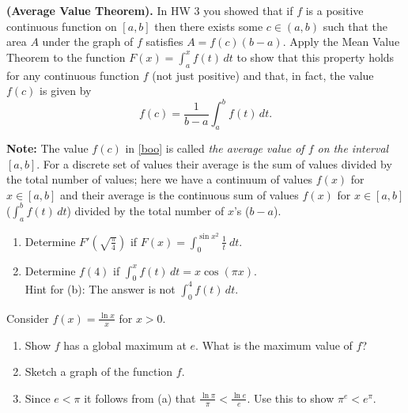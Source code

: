 \documentclass[12pt,letterpaper]{hmcpset}
\begin{document}

\begin{problem}[1]
  \textbf{(Average Value Theorem).} In HW 3 you showed that if $f$ is a positive continuous function on $[a,b]$ then there exists some $c \in (a,b)$ such that the area $A$ under the graph of $f$ satisfies $A = f(c) (b-a).$ Apply the Mean Value Theorem to the function $F(x) = \int_a^x f(t)\,dt$  to show that this property holds for any continuous function $f$ (not just positive) and that, in fact, the value $f(c)$ is given by  
  \begin{equation}
    f(c) = \frac{1}{b-a} \int_a^b f(t) \, dt.
    \label{boo}
  \end{equation}

  \noindent \textbf{Note:} The value $f(c)$ in \eqref{boo} is called \textit{the average value of $f$ on the interval $[a,b]$}. For a discrete set of values their average is the sum of values divided by the total number of values; here we have a continuum of values $f(x)$ for $x \in [a,b]$ and their average is the continuous sum of values $f(x)$ for $x \in [a,b]$ ($\int_a^b f(t) \, dt$) divided by the total number of $x$'s ($b-a$). 
\end{problem}
\begin{solution}
\end{solution}
\pagebreak

\begin{problem}[2]
  \begin{enumerate}[label=(\alph*)]
  \item Determine $F'\left( \sqrt{\frac{\pi}{4}}\right)$ if $F(x) = \displaystyle \int_0^{\sin x^2} \frac{1}{t} \ dt$.
  \item Determine  $f(4)$ if $\displaystyle \int_0^x f(t) \, dt = x\cos(\pi x).$ \\
    Hint for (b): The answer is not $\displaystyle \int_0^4 f(t) \,dt$.
  \end{enumerate}
\end{problem}
\begin{solution}
\end{solution}
\pagebreak

\begin{problem}[3]
  Consider $\displaystyle f(x) = \frac{\ln x}{x}$ for $x > 0$. 
  \begin{enumerate}[label=(\alph*)]
  \item Show $f$ has a global maximum at $e$. What is the maximum value of $f$? 
  \item Sketch a graph of the function $f$. 
  \item Since $e < \pi$ it follows from (a) that $\frac{\ln \pi}{\pi} < \frac{\ln e}{e}$. Use this to show $\pi^e < e^{\pi}$. 
  \end{enumerate}
\end{problem}
\begin{solution}
\end{solution}
\pagebreak
\end{document}
